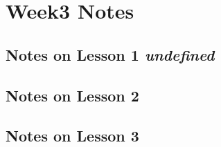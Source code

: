 \section{Week3 Notes}\SectionRule
    \subsection{Notes on Lesson 1
        \hfill\small\textit{undefined}
        }
    \subsection{Notes on Lesson 2}
    \subsection{Notes on Lesson 3}